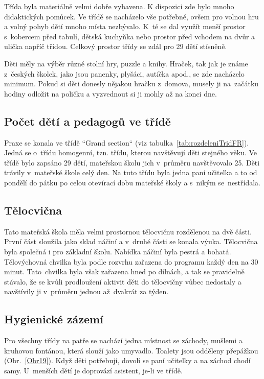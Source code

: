 			Třída byla materiálně velmi dobře vybavena. K dispozici zde bylo mnoho didaktických pomůcek. Ve třídě se nacházelo vše potřebné, ovšem pro volnou hru a volný pohyb dětí mnoho místa nezbývalo. K~té se dal využít menší prostor s kobercem před tabulí, dětská kuchyňka nebo prostor před vchodem na dvůr a ulička napříč třídou. Celkový prostor třídy se zdál pro 29 dětí stísněně.

			Děti měly na výběr různé stolní hry, puzzle a knihy. Hraček, tak jak je známe z~českých školek, jako jsou panenky, plyšáci, autíčka apod., se zde nacházelo minimum. Pokud si děti donesly nějakou hračku z~domova, musely ji na začátku hodiny odložit na poličku a vyzvednout si ji mohly až na konci dne. 

		\subsection{Počet dětí a pedagogů ve třídě}
		\label{trida}

			Praxe se konala ve třídě “Grand section“ (viz tabulka~\ref{tab:rozdeleniTridFR}). Jedná se o~třídu homogenní, tzn. třídu, kterou navštěvují děti stejného věku. Ve třídě bylo zapsáno 29 dětí, mateřskou školu jich v průměru navštěvovalo 25. Děti trávily v mateřské škole celý den. Na tuto třídu byla jedna paní učitelka a to od pondělí do pátku po celou otevírací dobu mateřské školy a s nikým se nestřídala. 

		\subsection{Tělocvična}
			Tato mateřská škola měla velmi prostornou tělocvičnu rozdělenou na dvě části. První část sloužila jako sklad náčiní a v~druhé části se konala výuka. Tělocvična byla společná i pro základní školu. Nabídka náčiní byla pestrá a bohatá. Tělovýchovná chvilka byla podle rozvrhu zařazena do programu každý den na 30 minut. Tato chvilka byla však zařazena hned po dílnách, a tak se pravidelně stávalo, že se kvůli prodloužení aktivit děti do tělocvičny vůbec nedostaly a navštívily ji v~průměru jednou až dvakrát za týden. 

		\subsection{Hygienické zázemí}
		\label{zachody}
			Pro všechny třídy na patře se nachází jedna místnost se záchody, mušlemi a kruhovou fontánou, která slouží jako umyvadlo. Toalety jsou odděleny přepážkou (Obr.~\ref{Obr19}). Když děti potřebují, dovolí se paní učitelky a na záchod chodí samy. U~menších dětí je doprovází asistent, je-li ve třídě. 
	

